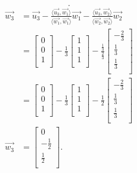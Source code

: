 \documentclass{report}
\begin{document}
{\[       .\] 
       \begin{align*}
        \vec{ w_3} &= \vec{ u_3} - \frac{ \langle \vec{ u_3} , \vec{ w_1}   \rangle   }{ \langle \vec{ w_1} ,\vec{ w_1}   \rangle  } \vec{ w_1} - \frac{ \langle \vec{ u_3} , \vec{ w_2}   \rangle   }{ \langle \vec{ w_2} ,\vec{ w_2}   \rangle  } \vec{ w_2} \\ 
        &=  \begin{bmatrix}
        0\\
        0\\
        1\\
        \end{bmatrix}
         - \frac{1}{3} \begin{bmatrix}
         1\\
         1\\
         1\\
         \end{bmatrix}
           - \frac{  \frac{ 1  }{ 3 }  }{  \frac{2}{3} } \begin{bmatrix}
           - \frac{2}{3}\\
           \frac{1}{3}\\
           \frac{1}{3}\\
           \end{bmatrix}
            \\    
            &=  \begin{bmatrix}
        0\\
        0\\
        1\\
        \end{bmatrix}
         - \frac{1}{3} \begin{bmatrix}
         1\\
         1\\
         1\\
         \end{bmatrix}
           - \frac{  1  }{  2 } \begin{bmatrix}
           - \frac{2}{3}\\
           \frac{1}{3}\\
           \frac{1}{3}\\
           \end{bmatrix}
            \\    
        \vec{ w_3} &= \begin{bmatrix}
        0 \\
        - \frac{1}{2}\\
        \frac{1}{2}\\
        \end{bmatrix}
       .\end{align*}
     }
     
     
      
     
     
     
     
     
      
    
    
    
 

  
 
 
 
 
 
 
\end{document}
